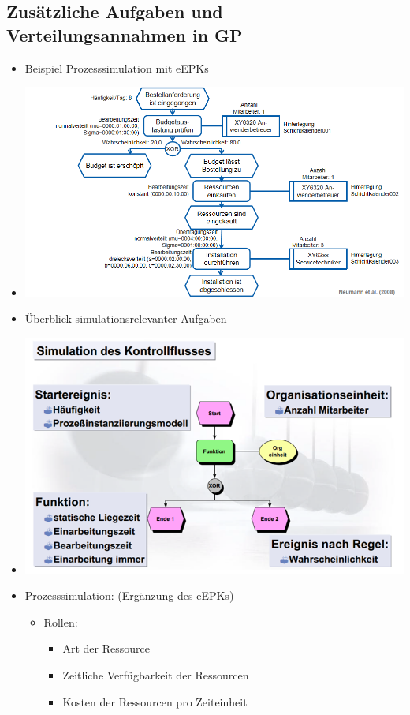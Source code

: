 \documentclass[11pt,a4paper]{article}
\begin{document}
\subsection{Zusätzliche Aufgaben und Verteilungsannahmen in GP}
\begin{itemize}
\item  Beispiel Prozesssimulation mit eEPKs
\item[] \includegraphics[width=15cm]{Bilder/simeepk} 
\item Überblick simulationsrelevanter Aufgaben
\item[] \includegraphics[width=15cm]{Bilder/simaufgaben} 
\item Prozesssimulation: (Ergänzung des eEPKs)
	\begin{itemize}
	\item Rollen:
		\begin{itemize}
		\item Art der Ressource 
		\item Zeitliche Verfügbarkeit der Ressourcen
		\item Kosten der Ressourcen pro Zeiteinheit

\end{itemize}
\end{itemize}
\end{itemize}
\end{document}
